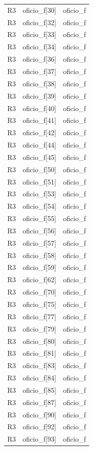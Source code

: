 \begin{longtable}{lll}
R3 & oficio\_f[30] & oficio\_f \\
R3 & oficio\_f[32] & oficio\_f \\
R3 & oficio\_f[33] & oficio\_f \\
R3 & oficio\_f[34] & oficio\_f \\
R3 & oficio\_f[36] & oficio\_f \\
R3 & oficio\_f[37] & oficio\_f \\
R3 & oficio\_f[38] & oficio\_f \\
R3 & oficio\_f[39] & oficio\_f \\
R3 & oficio\_f[40] & oficio\_f \\
R3 & oficio\_f[41] & oficio\_f \\
R3 & oficio\_f[42] & oficio\_f \\
R3 & oficio\_f[44] & oficio\_f \\
R3 & oficio\_f[45] & oficio\_f \\
R3 & oficio\_f[50] & oficio\_f \\
R3 & oficio\_f[51] & oficio\_f \\
R3 & oficio\_f[53] & oficio\_f \\
R3 & oficio\_f[54] & oficio\_f \\
R3 & oficio\_f[55] & oficio\_f \\
R3 & oficio\_f[56] & oficio\_f \\
R3 & oficio\_f[57] & oficio\_f \\
R3 & oficio\_f[58] & oficio\_f \\
R3 & oficio\_f[59] & oficio\_f \\
R3 & oficio\_f[62] & oficio\_f \\
R3 & oficio\_f[70] & oficio\_f \\
R3 & oficio\_f[75] & oficio\_f \\
R3 & oficio\_f[77] & oficio\_f \\
R3 & oficio\_f[79] & oficio\_f \\
R3 & oficio\_f[80] & oficio\_f \\
R3 & oficio\_f[81] & oficio\_f \\
R3 & oficio\_f[83] & oficio\_f \\
R3 & oficio\_f[84] & oficio\_f \\
R3 & oficio\_f[85] & oficio\_f \\
R3 & oficio\_f[87] & oficio\_f \\
R3 & oficio\_f[90] & oficio\_f \\
R3 & oficio\_f[92] & oficio\_f \\
R3 & oficio\_f[93] & oficio\_f \\

\end{longtable}
